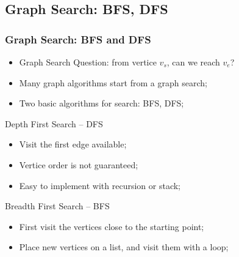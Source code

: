 \subsection{Graph Search: BFS, DFS}
\begin{frame}
  \frametitle{Graph Search: BFS and DFS}
    \begin{itemize}
    \item Graph Search Question: from vertice $v_s$, can we reach $v_e$?
    \item Many graph algorithms start from a graph search;
    \item Two basic algorithms for search: BFS, DFS;
    \end{itemize}

  \begin{block}{Depth First Search -- DFS}
    \begin{itemize}
      \item Visit the first edge available;
      \item Vertice order is not guaranteed;
      \item Easy to implement with recursion or stack;
    \end{itemize}
  \end{block}

  \begin{block}{Breadth First Search -- BFS}
    \begin{itemize}
      \item First visit the vertices close to the starting point;
      \item Place new vertices on a list, and visit them with a loop;
    \end{itemize}
  \end{block}
\end{frame}

